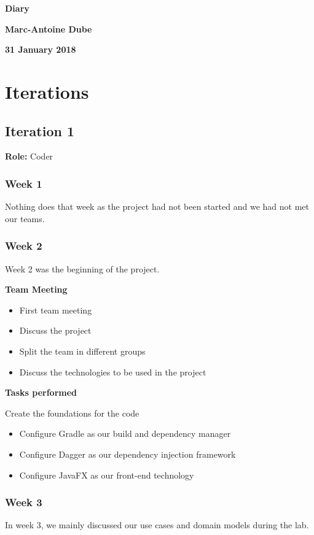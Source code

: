 \documentclass[11pt]{article}
\begin{document}
\vspace*{0.5in}
\centerline{\bf\Large Diary}

\vspace*{0.5in}
\centerline{\bf\Large Marc-Antoine Dube}

\vspace*{0.5in}
\centerline{\bf\Large 31 January 2018}

\section{Iterations}
\subsection{Iteration 1}
\textbf{Role: } Coder

\subsubsection{Week 1}
Nothing does that week as the project had not been started and we had not met our teams.

\subsubsection{Week 2}
Week 2 was the beginning of the project.

\textbf{Team Meeting}
\begin{itemize}
    \item First team meeting
    \item Discuss the project
    \item Split the team in different groups
    \item Discuss the technologies to be used in the project
\end{itemize}

\textbf{Tasks performed}
\item Create the foundations for the code
\begin{itemize}
    \item Configure Gradle as our build and dependency manager
    \item Configure Dagger as our dependency injection framework
    \item Configure JavaFX as our front-end technology
\end{itemize}

\subsubsection{Week 3}
In week 3, we mainly discussed our use cases and domain models during the lab.
\end{document}
